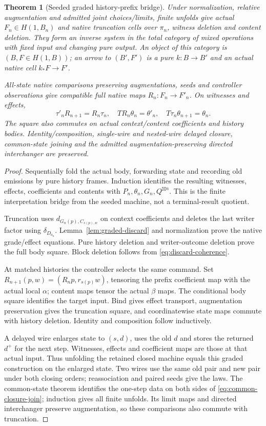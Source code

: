 \documentclass[11pt]{article}
\newtheorem{theorem}{Theorem}
\begin{document}
\begin{theorem}[Seeded graded history-prefix bridge]\label{thm:graded-prefix-feedback}
Under normalization, relative augmentation and admitted joint choices/limits, finite unfolds give actual $F_n\in H(1,B_n)$ and native truncation cells over $\pi_n$, witness deletion and content deletion. They form an inverse system in the total category of mixed operations with fixed input and changing pure output. An object of this category is $(B,F\in H(1,B))$; an arrow to $(B',F')$ is a pure $k:B\to B'$ and an actual native cell $k_*F\to F'$.

All-state native comparisons preserving augmentations, seeds and controller observations give compatible full native maps $R_n:F_n\to F'_n$. On witnesses and effects,
\[
 \tau'_nR_{n+1}=R_n\tau_n,\quad TR_n\theta_n=\theta'_n,\quad
 T\tau_n\theta_{n+1}=\theta_n.
 \tag{PT}\label{eq:graded-prefix-laws}
\]
The square also commutes on actual context/content coefficients and history bodies. Identity/composition, single-wire and nested-wire delayed closure, common-state joining and the admitted augmentation-preserving directed interchanger are preserved.
\end{theorem}
\begin{proof}
Sequentially fold the actual body, forwarding state and recording old emissions by pure history frames. Induction identifies the resulting witnesses, effects, coefficients and contents with $P_n,\theta_n,G_n,Q^{\boxtimes n}$. This is the finite interpretation bridge from the seeded machine, not a terminal-result quotient.

Truncation uses $d_{G_n(p),C_{s(p),w}}$ on context coefficients and deletes the last writer factor using $\delta_{D_{o_n}}$. Lemma~\ref{lem:graded-discard} and normalization prove the native grade/effect equations. Pure history deletion and writer-outcome deletion prove the full body square. Block deletion follows from \eqref{eq:discard-coherence}.

At matched histories the controller selects the same command. Set $R_{n+1}(p,w)=(R_np,r_{s(p)}w)$, tensoring the prefix coefficient map with the actual local $\alpha$; content maps tensor the actual $\beta$ maps. The conditional body square identifies the target input. Bind gives effect transport, augmentation preservation gives the truncation square, and coordinatewise state maps commute with history deletion. Identity and composition follow inductively.

A delayed wire enlarges state to $(s,d)$, uses the old $d$ and stores the returned $d^+$ for the next step. Witnesses, effects and coefficient maps are those at that actual input. Thus unfolding the retained closed machine equals this graded construction on the enlarged state. Two wires use the same old pair and new pair under both closing orders; reassociation and paired seeds give the laws. The common-state theorem identifies the one-step data on both sides of \eqref{eq:common-closure-join}; induction gives all finite unfolds. Its limit maps and directed interchanger preserve augmentation, so these comparisons also commute with truncation.
\end{proof}
\end{document}
